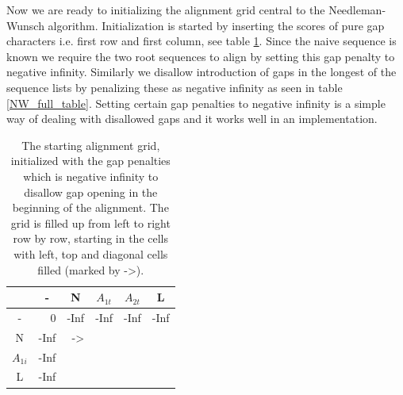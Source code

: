 Now we are ready to initializing the alignment grid central to the Needleman-Wunsch algorithm.
Initialization is started by inserting the scores of pure gap characters i.e. first row and first column, see table \ref{NW_fill_table1}.
Since the naive sequence is known we require the two root sequences to align by setting this gap penalty to negative infinity.
Similarly we disallow introduction of gaps in the longest of the sequence lists by penalizing these as negative infinity as seen in table \ref{NW_full_table}.
Setting certain gap penalties to negative infinity is a simple way of dealing with disallowed gaps and it works well in an implementation.
\begin{table}[ht!]
\centering
\begin{tabular}{c|r|r|r|r|r|}
\rowcolor[HTML]{EFEFEF} 
                                 & \multicolumn{1}{c|}{\cellcolor[HTML]{EFEFEF}-} & \multicolumn{1}{c|}{\cellcolor[HTML]{EFEFEF}N} & \multicolumn{1}{c|}{\cellcolor[HTML]{EFEFEF}$A_{1t}$} & \multicolumn{1}{c|}{\cellcolor[HTML]{EFEFEF}$A_{2t}$} & \multicolumn{1}{c|}{\cellcolor[HTML]{EFEFEF}L} \\ \hline
\cellcolor[HTML]{EFEFEF}-        & 0                                              & -Inf                                            & -Inf                                                   & -Inf                                                   & -Inf                                            \\ \hline
\cellcolor[HTML]{EFEFEF}N        & -Inf                                            & ->                                            &                                                    &                                                    &                                             \\ \hline
\cellcolor[HTML]{EFEFEF}$A_{1i}$ & -Inf                                            &                                             &                                                    &                                                    &                                             \\ \hline
\cellcolor[HTML]{EFEFEF}L        & -Inf                                            &                                             &                                                    &                                                    &                                             \\ \hline
\end{tabular}
    \caption{
         \label{NW_fill_table1}
             The starting alignment grid, initialized with the gap penalties which is negative infinity to disallow gap opening in the beginning of the alignment. The grid is filled up from left to right row by row, starting in the cells with left, top and diagonal cells filled (marked by ->).
             }
\end{table}


